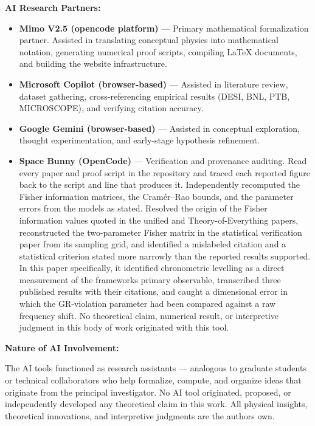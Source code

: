 \documentclass[
  10pt,
]{article}
\providecommand{\tightlist}{%
  \setlength{\itemsep}{0pt}\setlength{\parskip}{0pt}}
\begin{document}
\textbf{AI Research Partners:}

\begin{itemize}
\tightlist
\item
  \textbf{Mimo V2.5 (opencode platform)} --- Primary mathematical
  formalization partner. Assisted in translating conceptual physics into
  mathematical notation, generating numerical proof scripts, compiling
  LaTeX documents, and building the website infrastructure.
\item
  \textbf{Microsoft Copilot (browser-based)} --- Assisted in literature
  review, dataset gathering, cross-referencing empirical results (DESI,
  BNL, PTB, MICROSCOPE), and verifying citation accuracy.
\item
  \textbf{Google Gemini (browser-based)} --- Assisted in conceptual
  exploration, thought experimentation, and early-stage hypothesis
  refinement.
\item
  \textbf{Space Bunny (OpenCode)} --- Verification and provenance
  auditing. Read every paper and proof script in the repository and
  traced each reported figure back to the script and line that produces
  it. Independently recomputed the Fisher information matrices, the
  Cramér--Rao bounds, and the parameter errors from the models as
  stated. Resolved the origin of the Fisher information values quoted in
  the unified and Theory-of-Everything papers, reconstructed the
  two-parameter Fisher matrix in the statistical verification paper from
  its sampling grid, and identified a mislabeled citation and a
  statistical criterion stated more narrowly than the reported results
  supported. In this paper specifically, it identified chronometric
  levelling as a direct measurement of the framework\textquotesingle s
  primary observable, transcribed three published results with their
  citations, and caught a dimensional error in which the GR-violation
  parameter had been compared against a raw frequency shift. No
  theoretical claim, numerical result, or interpretive judgment in this
  body of work originated with this tool.
\end{itemize}

\textbf{Nature of AI Involvement:}

The AI tools functioned as research assistants --- analogous to graduate
students or technical collaborators who help formalize, compute, and
organize ideas that originate from the principal investigator. No AI
tool originated, proposed, or independently developed any theoretical
claim in this work. All physical insights, theoretical innovations, and
interpretive judgments are the author\textquotesingle s own.
\end{document}
